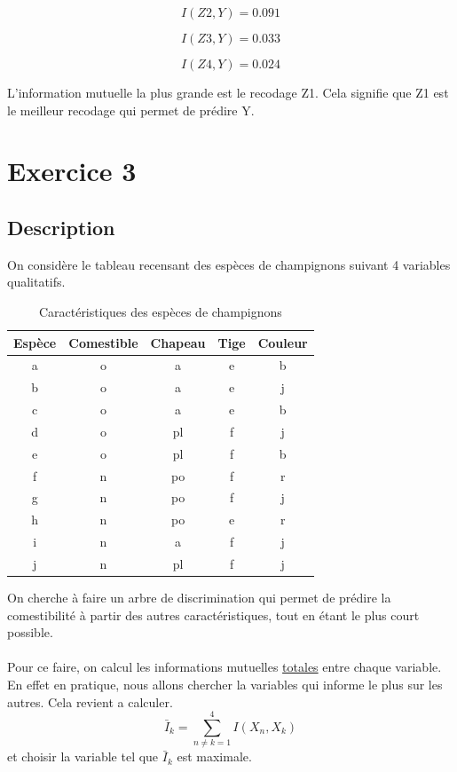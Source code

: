 \documentclass{article}
\begin{document}
\[
I(Z2,Y) = 0.091
\]

\[
I(Z3,Y) = 0.033
\]

\[
I(Z4,Y) = 0.024
\]

L'information mutuelle la plus grande est le recodage Z1.
Cela signifie que Z1 est le meilleur recodage qui permet de prédire Y.


\newpage
\section{Exercice 3}
\subsection{Description}

On considère le tableau recensant des espèces de champignons suivant 4 variables qualitatifs. 

\begin{table}[h]
  \centering
  \caption{Caractéristiques des espèces de champignons}
  \begin{tabular}{@{}ccccc@{}}
  \toprule
  Espèce & Comestible & Chapeau & Tige & Couleur \\ \midrule
  a      & o          & a       & e    & b       \\
  b      & o          & a       & e    & j       \\
  c      & o          & a       & e    & b       \\
  d      & o          & pl      & f    & j       \\
  e      & o          & pl      & f    & b       \\
  f      & n          & po      & f    & r       \\
  g      & n          & po      & f    & j       \\
  h      & n          & po      & e    & r       \\
  i      & n          & a       & f    & j       \\
  j      & n          & pl      & f    & j       \\ \bottomrule
  \end{tabular}
  
  \label{tab:champignons}
  \end{table}

  On cherche à faire un arbre de discrimination qui permet de prédire la comestibilité à partir des autres caractéristiques, tout en étant le plus court possible.
  \\
  \\
  Pour ce faire, on calcul les informations mutuelles \underline{totales} entre chaque variable.
  En effet en pratique, nous allons chercher la variables qui informe le plus sur les autres. Cela revient a calculer.
  \begin{equation}
    \bar{I}_k = \sum_{n \neq k = 1}^{4} I(X_n,X_k)
    \label{eq : I bar}
  \end{equation}
  et choisir la variable tel que $\bar{I}_k$ est maximale.
\end{document}
